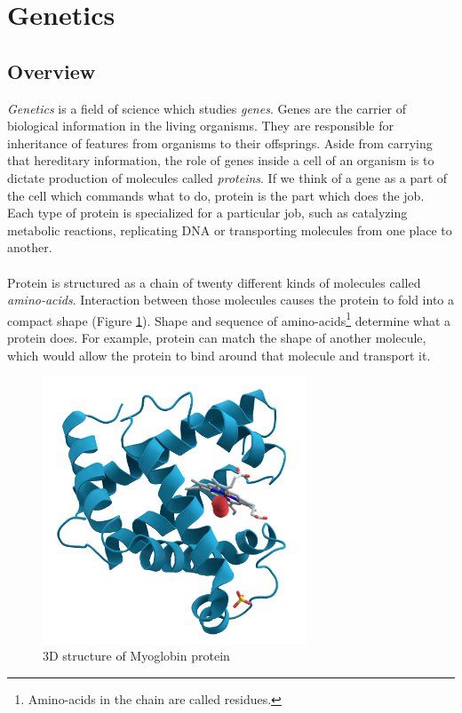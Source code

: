 \documentclass[times, utf8, diplomski]{fer}
\begin{document}
\section{Genetics}
\subsection{Overview}

\emph{Genetics} is a field of science which studies \emph{genes}. Genes are the carrier of biological information in the living organisms. They are responsible for inheritance of features from organisms to their offsprings. Aside from carrying that hereditary information, the role of genes inside a cell of an organism is to dictate production of molecules called \emph{proteins}. If we think of a gene as a part of the cell which commands what to do, protein is the part which does the job. Each type of protein is specialized for a particular job, such as catalyzing metabolic reactions, replicating  DNA or transporting molecules from one place to another.
\\
\\
Protein is structured as a chain of twenty different kinds of molecules called \emph{amino-acids}. Interaction between those molecules causes the protein to fold into a compact shape (Figure \ref{myoglobin}). Shape and sequence of amino-acids\footnote{Amino-acids in the chain are called residues.} determine what a protein does. For example, protein can match the shape of another molecule, which would allow the protein to bind around that molecule and transport it.

\begin{figure}[!ht]
\begin{center}
	\includegraphics[width=0.7\textwidth]{../img/Myoglobin.png}
	\caption{3D structure of Myoglobin protein\protect\cite{myoglobin.img}}\label{myoglobin}
\end{center}
\end{figure}
\end{document}
